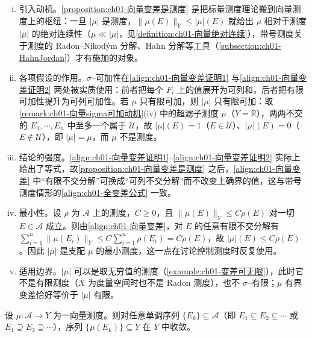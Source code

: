 \documentclass[../../main.tex]{subfiles}%
\begin{document}
\begin{remark}\label{remark:ch01-向量变差是测度注}
\begin{enumerate}[(i)]
\item 引入动机。\cref{proposition:ch01-向量变差是测度} 是把标量测度理论搬到向量测度上的枢纽：一旦 $|\mu|$ 是测度，$\|\mu(E)\|_Y\leqslant|\mu|(E)$ 就给出 $\mu$ 相对于测度 $|\mu|$ 的绝对连续性（$\mu\ll|\mu|$，见\cref{definition:ch01-向量绝对连续}），带号测度关于测度的 Radon--Nikodým 分解、Hahn 分解等工具（\cref{subsection:ch01-HahnJordan}）才有施加的对象。
\item 各项假设的作用。$\sigma$--可加性在\eqref{align:ch01-向量变差证明1} 与\eqref{align:ch01-向量变差证明2} 两处被实质使用：前者把每个 $F_i$ 上的值展开为可列和，后者把有限可加性提升为可列可加性。若 $\mu$ 只有限可加，则 $|\mu|$ 只有限可加：取\cref{remark:ch01-向量sigma可加动机}(iv) 中的超滤子测度 $\mu$（$Y=\mathbb{R}$），两两不交的 $E_1,\cdots ,E_n$ 中至多一个属于 $\mathcal{U}$，故 $|\mu|(E)=1$（$E\in\mathcal{U}$）、$|\mu|(E)=0$（$E\notin\mathcal{U}$），即 $|\mu|=\mu$，而 $\mu$ 不是测度。
\item 结论的强度。\eqref{align:ch01-向量变差证明1}--\eqref{align:ch01-向量变差证明2} 实际上给出了等式，故\cref{proposition:ch01-向量变差是测度} 之后，\eqref{align:ch01-向量变差} 中“有限不交分解”可换成“可列不交分解”而不改变上确界的值，这与带号测度情形的\eqref{align:ch01-全变差公式} 一致。
\item 最小性。设 $\rho$ 为 $\mathcal{A}$ 上的测度，$C\geqslant0$，且 $\|\mu(E)\|_Y\leqslant C\rho(E)$ 对一切 $E\in\mathcal{A}$ 成立。则由\eqref{align:ch01-向量变差}，对 $E$ 的任意有限不交分解有 $\sum_{i=1}^n\|\mu(E_i)\|_Y\leqslant C\sum_{i=1}^n\rho(E_i)=C\rho(E)$，故 $|\mu|(E)\leqslant C\rho(E)$。因此 $|\mu|$ 是支配 $\mu$ 的最小测度，这一点在讨论控制测度时反复使用。
\item 适用边界。$|\mu|$ 可以是取无穷值的测度（\cref{example:ch01-变差可无限}），此时它不是有限测度（$X$ 为度量空间时也不是 Radon 测度），也不 $\sigma$--有限；$\mu$ 有界变差恰好等价于 $|\mu|$ 有限。
\end{enumerate}
\end{remark}

\begin{lemma}\label{lemma:ch01-向量单调序列收敛}
\label{lemma:ch01-向量测度连续}
设 $\mu:\mathcal{A}\to Y$ 为一向量测度。则对任意单调序列 $\{E_k\}\subseteq\mathcal{A}$（即 $E_1\subseteq E_2\subseteq\cdots$ 或 $E_1\supseteq E_2\supseteq\cdots$），序列 $\{\mu(E_k)\}\subseteq Y$ 在 $Y$ 中收敛。
\end{lemma}
\end{document}

